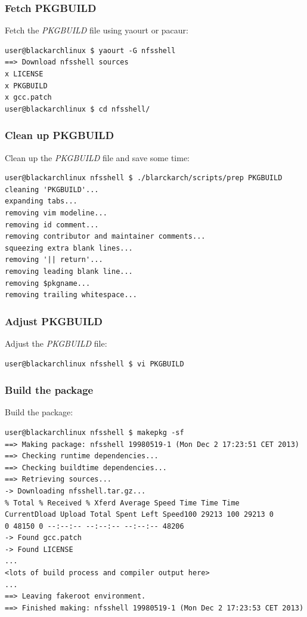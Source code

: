 \documentclass[a4paper, oneside, 11pt]{book}
\begin{document}
\subsubsection{Fetch PKGBUILD}
Fetch the \textit{PKGBUILD} file using yaourt or pacaur:
{\small
\color{gray}
\begin{verbatim}
user@blackarchlinux $ yaourt -G nfsshell
==> Download nfsshell sources
x LICENSE
x PKGBUILD
x gcc.patch
user@blackarchlinux $ cd nfsshell/
\end{verbatim}
}

\subsubsection{Clean up PKGBUILD}
Clean up the \textit{PKGBUILD} file and save some time:
{\small
\color{gray}
\begin{verbatim}
user@blackarchlinux nfsshell $ ./blarckarch/scripts/prep PKGBUILD
cleaning 'PKGBUILD'...
expanding tabs...
removing vim modeline...
removing id comment...
removing contributor and maintainer comments...
squeezing extra blank lines...
removing '|| return'...
removing leading blank line...
removing $pkgname...
removing trailing whitespace...
\end{verbatim}
}

\subsubsection{Adjust PKGBUILD}
Adjust the \textit{PKGBUILD} file:
{\small
\color{gray}
\begin{verbatim}
user@blackarchlinux nfsshell $ vi PKGBUILD
\end{verbatim}
}

\subsubsection{Build the package}
Build the package:
{\small
\color{gray}
\begin{verbatim}
user@blackarchlinux nfsshell $ makepkg -sf
==> Making package: nfsshell 19980519-1 (Mon Dec 2 17:23:51 CET 2013)
==> Checking runtime dependencies...
==> Checking buildtime dependencies...
==> Retrieving sources...
-> Downloading nfsshell.tar.gz...
% Total % Received % Xferd Average Speed Time Time Time
CurrentDload Upload Total Spent Left Speed100 29213 100 29213 0
0 48150 0 --:--:-- --:--:-- --:--:-- 48206
-> Found gcc.patch
-> Found LICENSE
...
<lots of build process and compiler output here>
...
==> Leaving fakeroot environment.
==> Finished making: nfsshell 19980519-1 (Mon Dec 2 17:23:53 CET 2013)
\end{verbatim}
}
\end{document}
